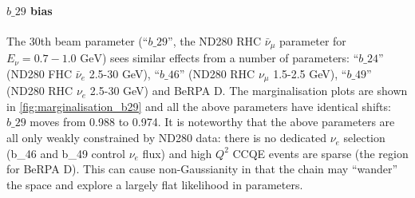 \paragraph{$b\_29$ bias}
The 30th beam parameter (``$b\_29$'', the ND280 RHC $\bar{\nu}_\mu$ parameter for $E_\nu= 0.7-1.0\text{ GeV}$) sees similar effects from a number of parameters: ``$b\_24$'' (ND280 FHC $\bar{\nu}_e$ 2.5-30 GeV), ``$b\_46$'' (ND280 RHC $\nu_\mu$ 1.5-2.5 GeV), ``$b\_49$'' (ND280 RHC $\nu_e$ 2.5-30 GeV) and BeRPA D. The marginalisation plots are shown in \autoref{fig:marginalisation_b29} and all the above parameters have identical shifts: $b\_29$ moves from 0.988 to 0.974. It is noteworthy that the above parameters are all only weakly constrained by ND280 data: there is no dedicated $\nu_e$ selection (b\_46 and b\_49 control $\nu_e$ flux) and high $Q^2$ CCQE events are sparse (the region for BeRPA D). This can cause non-Gaussianity in that the chain may ``wander'' the space and explore a largely flat likelihood in parameters.
